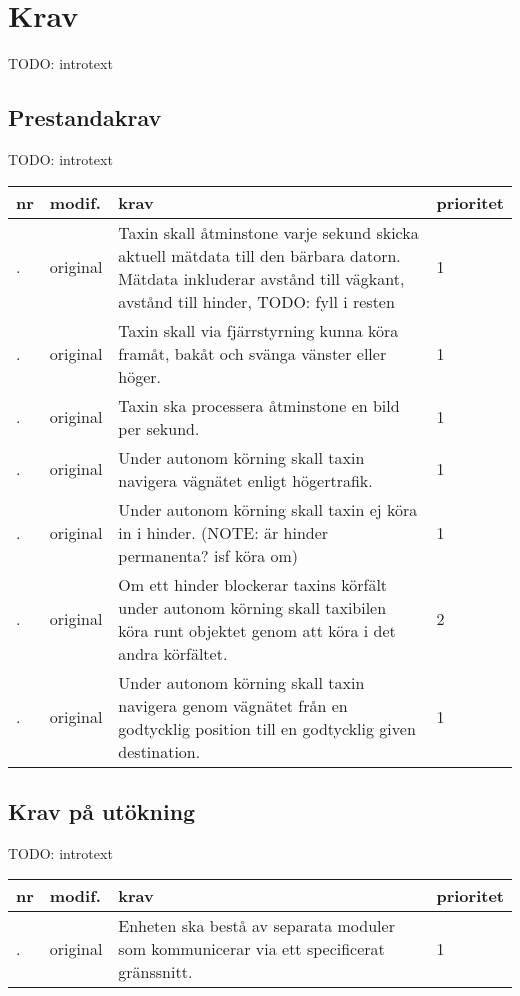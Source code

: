 \documentclass[kravspec/krav.tex]{subfiles}
\newcounter{reqcat} %
\newcounter{reqitem} %
\newenvironment{reqlist}
{
    \setlength{\tabcolsep}{12pt}
    \renewcommand{\arraystretch}{1.6}
    \stepcounter{reqcat}
    \begin{longtable}{p{8mm}p{13mm}p{9cm}p{18mm}}
        \bfseries nr &
        \bfseries modif. &
        \bfseries krav &
        \bfseries prioritet \\\hline
        \endhead
}{
    \end{longtable}
}
\newcommand{\reqspec}[3]{
    \stepcounter{reqitem}\thereqcat.\thereqitem & #1 & #3 & #2 \\
}
\newcommand{\req}[1]{\reqspec{original}{1}{#1}}
\begin{document}
\section{Krav}
TODO: introtext

\subsection{Prestandakrav}
TODO: introtext

\begin{reqlist}
    \req{Taxin skall åtminstone varje sekund skicka aktuell mätdata till den
    bärbara datorn. Mätdata inkluderar avstånd till vägkant, avstånd till
    hinder, TODO: fyll i resten}
    \req{Taxin skall via fjärrstyrning kunna köra framåt, bakåt och svänga
    vänster eller höger.}
    \req{Taxin ska processera åtminstone en bild per sekund.}
    \req{Under autonom körning skall taxin navigera vägnätet enligt
    högertrafik.}
    \req{Under autonom körning skall taxin ej köra in i hinder. (NOTE: är
    hinder permanenta? isf köra om)}
    \reqspec{original}{2}{Om ett hinder blockerar taxins körfält under autonom
    körning skall taxibilen köra runt objektet genom att köra i det andra
    körfältet.}
    \req{Under autonom körning skall taxin navigera genom vägnätet från en
    godtycklig position till en godtycklig given destination.}
\end{reqlist}

\subsection{Krav på utökning}
TODO: introtext

\begin{reqlist}
    \req{Enheten ska bestå av separata moduler som kommunicerar via ett
    specificerat gränssnitt.}
\end{reqlist}
\end{document}
